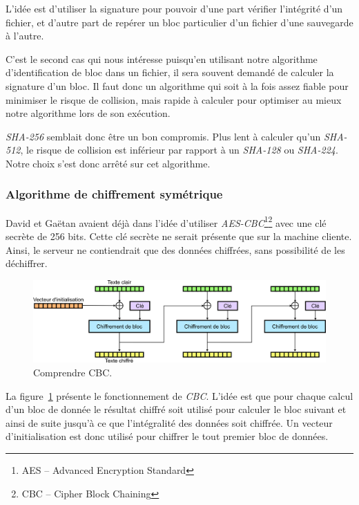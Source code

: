 \documentclass[a4paper,10pt, twoside]{report}
\begin{document}
\begin{spacing}{1.2}
L'idée est d'utiliser la signature pour pouvoir d'une part vérifier l'intégrité
d'un fichier, et d'autre part de repérer un bloc particulier d'un fichier d'une
sauvegarde à l'autre.

C'est le second cas qui nous intéresse puisqu'en utilisant notre algorithme
d'identification de bloc dans un fichier, il sera souvent demandé de calculer
la signature d'un bloc. Il faut donc un algorithme qui soit à la fois assez
fiable pour minimiser le risque de collision, mais rapide à calculer pour
optimiser au mieux notre algorithme lors de son exécution.

\textit{SHA-256}\cite{refSHA256} semblait donc être un bon compromis. Plus lent
à calculer qu'un \textit{SHA-512}, le risque de collision est inférieur par
rapport à un \textit{SHA-128} ou \textit{SHA-224}. Notre choix s'est donc arrêté
sur cet algorithme.

\subsubsection{Algorithme de chiffrement symétrique}

David et Gaëtan avaient déjà dans l'idée d'utiliser
\textit{AES-CBC}\footnote{AES -- Advanced Encryption Standard}\footnote{CBC --
Cipher Block Chaining}\cite{refAES}\cite{refCBC} avec une clé secrète de 256
bits. Cette clé secrète ne serait présente que sur la machine cliente. Ainsi,
le serveur ne contiendrait que des données chiffrées, sans possibilité de les
déchiffrer.

\begin{figure}[h!]
  \centering
  \includegraphics[width=15cm]{softwareDesign/schemaCBC.png}
  \caption{\label{schemaCBC} Comprendre CBC.}
\end{figure}

La figure~\ref{schemaCBC} présente le fonctionnement de \textit{CBC}. L'idée
est que pour chaque calcul d'un bloc de donnée le résultat chiffré soit utilisé
pour calculer le bloc suivant et ainsi de suite jusqu'à ce que l'intégralité
des données soit chiffrée. Un vecteur d'initialisation est donc utilisé pour
chiffrer le tout premier bloc de données.


\end{spacing}
\end{document}
